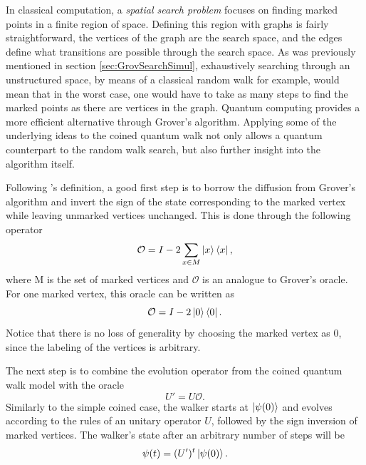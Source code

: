 \documentclass[../../dissertation.tex]{subfiles}
\begin{document}
In classical computation, a \textit{spatial search problem} focuses on finding
marked points in a finite region of space. Defining this region with graphs is
fairly straightforward, the vertices of the graph are the search space, and the
edges define what transitions are possible through the search space. As was
previously mentioned in section \ref{sec:GrovSearchSimul}, exhaustively
searching through an unstructured space, by means of a classical random walk
for example, would mean that in the worst case, one would have to take as many
steps to find the marked points as there are vertices in the graph. Quantum
computing provides a more efficient alternative through Grover's
algorithm. Applying some of the underlying ideas to the coined quantum walk not only
allows a quantum counterpart to the random walk search, but also further
insight into the algorithm itself.\par

Following \cite{REN1}'s definition, a good first step is to borrow the
diffusion from Grover's algorithm and invert the sign of the state
corresponding to the marked vertex while leaving unmarked vertices unchanged.
This is done through the following operator 
\begin{equation}
	\mathcal{O} = I - 2 \sum_{x\in M} \ket{x}\bra{x},
\end{equation}
where M is the set of marked vertices and $\mathcal{O}$ is an analogue to
Grover's oracle. For one marked vertex, this oracle can be written as 
\begin{equation}
	\mathcal{O} = I - 2 \ket{0}\bra{0}.
\end{equation}
Notice that there is no loss of generality by choosing the marked vertex as
$0$, since the labeling of the vertices is arbitrary.\par 

The next step is to combine the evolution operator from the coined quantum walk
model with the oracle
\begin{equation}
	U'= U\mathcal{O}.
	\label{eq:modUCoinedSimul}
\end{equation}
Similarly to the simple coined case, the walker starts at $\ket{\psi(0)}$ and
evolves according to the rules of an unitary operator $U$, followed by the sign
inversion of marked vertices. The walker's state after an arbitrary number of
steps will be
\begin{equation}
	\psi(t) = (U')^t\ket{\psi(0)}.
	\label{eq:sysStateSearch}
\end{equation}\par
\end{document}
